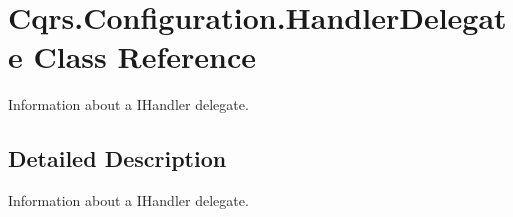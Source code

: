 \hypertarget{classCqrs_1_1Configuration_1_1HandlerDelegate}{}\section{Cqrs.\+Configuration.\+Handler\+Delegate Class Reference}
\label{classCqrs_1_1Configuration_1_1HandlerDelegate}


Information about a I\+Handler delegate.  




\subsection{Detailed Description}
Information about a I\+Handler delegate. 

